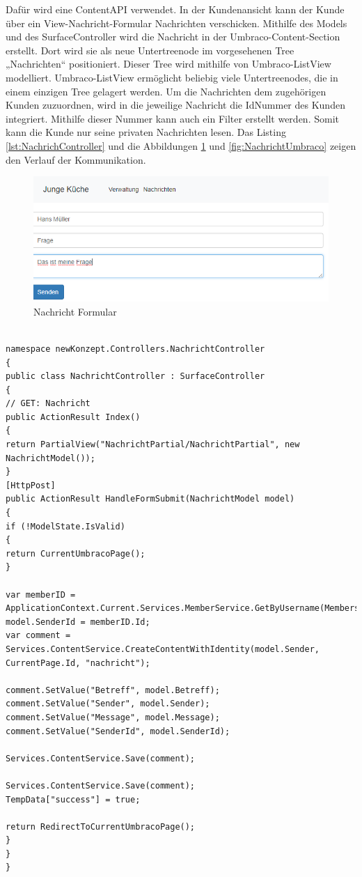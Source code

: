 Dafür wird eine ContentAPI \cite{UmbracoHQContent2018} verwendet. In der Kundenansicht kann der Kunde über ein View-Nachricht-Formular Nachrichten verschicken. Mithilfe des Models und des SurfaceController wird die Nachricht in der Umbraco-Content-Section erstellt. Dort wird sie als neue Untertreenode im vorgesehenen Tree „Nachrichten“ positioniert. Dieser Tree wird mithilfe von Umbraco-ListView modelliert. Umbraco-ListView ermöglicht beliebig viele Untertreenodes, die in einem einzigen Tree gelagert werden. Um die Nachrichten dem zugehörigen Kunden zuzuordnen, wird in die jeweilige Nachricht die IdNummer des Kunden integriert. Mithilfe dieser Nummer kann auch ein Filter erstellt werden.
Somit kann die Kunde nur seine privaten Nachrichten lesen. Das Listing \ref{lst:NachrichController} und die Abbildungen \ref{fig:NachrichtNEU} und \ref{fig:NachrichtUmbraco} zeigen den Verlauf der Kommunikation.

\begin{figure}[h]
	\centering
	\includegraphics[width=0.7\linewidth]{Graphics/NachrichtNEU.png}
	\caption[Nachricht Formular]{Nachricht Formular}
	\label{fig:NachrichtNEU}
\end{figure}
\begin{lstlisting}[caption={NachrichController}, label=lst:NachrichController]

namespace newKonzept.Controllers.NachrichtController
{
public class NachrichtController : SurfaceController
{
// GET: Nachricht
public ActionResult Index()
{
return PartialView("NachrichtPartial/NachrichtPartial", new NachrichtModel());
}
[HttpPost]
public ActionResult HandleFormSubmit(NachrichtModel model)
{
if (!ModelState.IsValid)
{
return CurrentUmbracoPage();
}

var memberID = ApplicationContext.Current.Services.MemberService.GetByUsername(Membership.GetUser().UserName);
model.SenderId = memberID.Id;
var comment = Services.ContentService.CreateContentWithIdentity(model.Sender, CurrentPage.Id, "nachricht");

comment.SetValue("Betreff", model.Betreff);
comment.SetValue("Sender", model.Sender);
comment.SetValue("Message", model.Message);
comment.SetValue("SenderId", model.SenderId);

Services.ContentService.Save(comment);

Services.ContentService.Save(comment);
TempData["success"] = true;

return RedirectToCurrentUmbracoPage();
}
}
}
\end{lstlisting}


